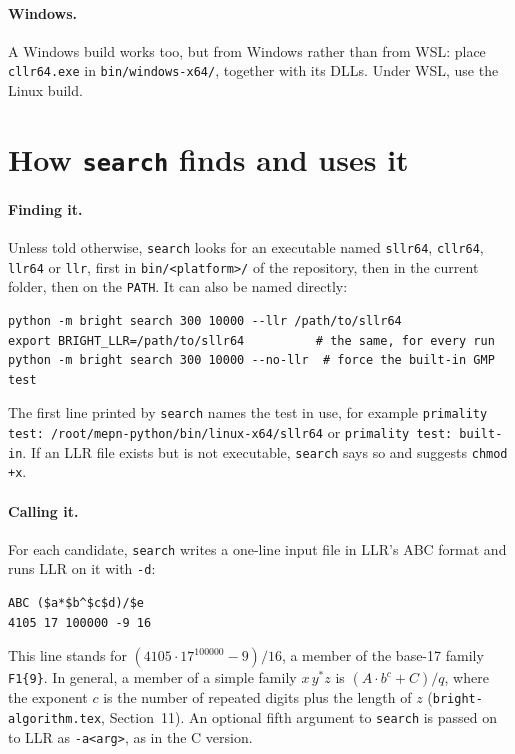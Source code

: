 \documentclass[11pt]{article}
\newcommand{\code}[1]{\texttt{#1}}
\begin{document}
\paragraph{Windows.} A Windows build works too, but from Windows rather than from WSL: place \code{cllr64.exe} in \code{bin/windows-x64/}, together with its DLLs. Under WSL, use the Linux build.

\section{How \texttt{search} finds and uses it}

\paragraph{Finding it.} Unless told otherwise, \code{search} looks for an executable named \code{sllr64}, \code{cllr64}, \code{llr64} or \code{llr}, first in \code{bin/<platform>/} of the repository, then in the current folder, then on the \code{PATH}. It can also be named directly:
\begin{Verbatim}
python -m bright search 300 10000 --llr /path/to/sllr64
export BRIGHT_LLR=/path/to/sllr64          # the same, for every run
python -m bright search 300 10000 --no-llr  # force the built-in GMP test
\end{Verbatim}
The first line printed by \code{search} names the test in use, for example \code{primality test: /root/mepn-python/bin/linux-x64/sllr64} or \code{primality test: built-in}. If an LLR file exists but is not executable, \code{search} says so and suggests \code{chmod +x}.

\paragraph{Calling it.} For each candidate, \code{search} writes a one-line input file in LLR's ABC format and runs LLR on it with \code{-d}:
\begin{Verbatim}
ABC ($a*$b^$c$d)/$e
4105 17 100000 -9 16
\end{Verbatim}
This line stands for $(4105\cdot17^{100000}-9)/16$, a member of the base-17 family \code{F1\{9\}}. In general, a member of a simple family $x\,y^*z$ is $(A\cdot b^{c}+C)/q$, where the exponent $c$ is the number of repeated digits plus the length of $z$ (\code{bright-algorithm.tex}, Section~11). An optional fifth argument to \code{search} is passed on to LLR as \code{-a<arg>}, as in the C version.
\end{document}
